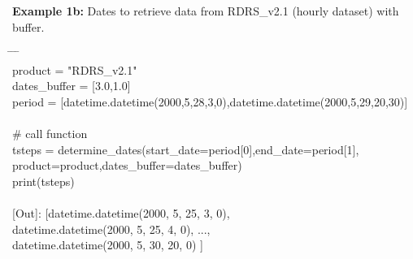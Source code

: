 \documentclass[10pt,a4paper,titlepage,parskip]{scrartcl}
\newenvironment{ttfont}{\fontfamily{\ttdefault}\selectfont}{\par}
\newcommand{\GRAU}[1]{\textcolor{ufzgray2}{#1}}
\begin{document}
\textbf{Example 1b:} Dates to retrieve data from RDRS\_v2.1 (hourly dataset) with buffer.
\begin{framed}
	\vspace*{-1.2cm}
	\begin{ttfont}
		\begin{tabbing}
			\hspace{1.5cm} \= \hspace{2.7cm} \= \hspace{4.7cm} \= \kill \\[4pt]
			product = "RDRS\_v2.1"\\
			dates\_buffer = [3.0,1.0]\\
			period = [datetime.datetime(2000,5,28,3,0),datetime.datetime(2000,5,29,20,30)]\\
			\\
			\GRAU{\# call function}\\
			tsteps = determine\_dates(start\_date=period[0],end\_date=period[1],\\
			\> \> product=product,dates\_buffer=dates\_buffer)\\
			print(tsteps)\\
			\\
			\GRAU{[Out]: [datetime.datetime(2000, 5, 25, 3, 0),}\\
			\> 	\GRAU{ datetime.datetime(2000, 5, 25, 4, 0), ..., }\\
			\> 	\GRAU{ datetime.datetime(2000, 5, 30, 20, 0) ]   }\\
		\end{tabbing}
	\end{ttfont}
	\vspace*{-0.3cm}
\end{framed}
\vspace*{-0.3cm}
\end{document}
